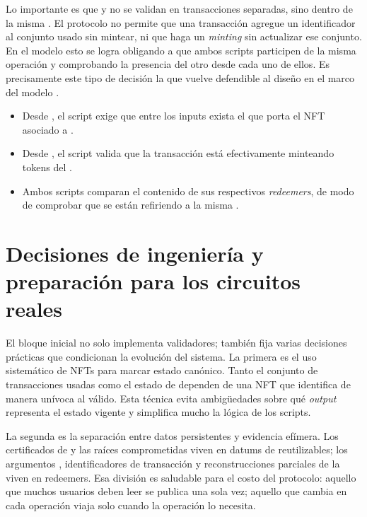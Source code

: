 Lo importante es que \MintingValidator y \TxsUpdaterMintingValidator no se validan en transacciones separadas, sino dentro de la misma \MintTx. El protocolo no permite que una transacción agregue un identificador al conjunto usado sin mintear, ni que haga un \textit{minting} sin actualizar ese conjunto. En el modelo \eUTxO esto se logra obligando a que ambos scripts participen de la misma operación y comprobando la presencia del otro desde cada uno de ellos. Es precisamente este tipo de decisión la que vuelve defendible al diseño en el marco del modelo \eUTxO.

\begin{itemize}[noitemsep]
	\item Desde \MintingValidator, el script exige que entre los inputs exista el \UTxO que porta el NFT asociado a \TxsUpdaterMintingValidator.
	\item Desde \TxsUpdaterMintingValidator, el script valida que la transacción está efectivamente minteando tokens del \zkBridge.
	\item Ambos scripts comparan el contenido de sus respectivos \textit{redeemers}, de modo de comprobar que se están refiriendo a la misma \LockTx.
\end{itemize}

\section{Decisiones de ingeniería y preparación para los circuitos reales}
\label{sec:validadores-y-flujo-transaccional-decisiones-de-ingenieria-y-preparacion-para-los-circuitos-reales}

El bloque inicial no solo implementa validadores; también fija varias decisiones prácticas que condicionan la evolución del sistema. La primera es el uso sistemático de NFTs para marcar estado canónico. Tanto el conjunto de transacciones usadas como el estado de \StakeDistribution dependen de una NFT que identifica de manera unívoca al \UTxO válido. Esta técnica evita ambigüedades sobre qué \textit{output} representa el estado vigente y simplifica mucho la lógica de los scripts.

La segunda es la separación entre datos persistentes y evidencia efímera. Los certificados de \Mithril y las raíces comprometidas viven en datums de \UTxOs reutilizables; los argumentos \ZK, identificadores de transacción y reconstrucciones parciales de la \LockTx viven en redeemers. Esa división es saludable para el costo del protocolo: aquello que muchos usuarios deben leer se publica una sola vez; aquello que cambia en cada operación viaja solo cuando la operación lo necesita.

